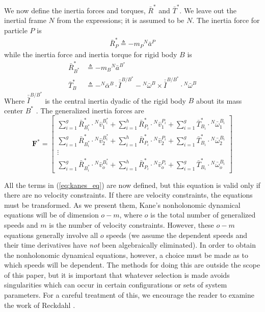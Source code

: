 \documentclass[smallcondensed,final]{svjour3}                     %
\begin{document}
We now define the inertia forces and torques, $\bar{R}^*$ and $\bar{T}^*$. We
leave out the inertial frame $N$ from the expressions; it is assumed to be $N$.
The inertia force for particle $P$ is
\begin{align}
\label{eq:particle_gen_inertia}
\bar{R}^*_P \triangleq -m_P {^N}\bar{a}^P
\end{align}
while the inertia force and inertia torque for rigid body $B$ is
\begin{align}
\label{eq:rb_translational_gen_inertia}
\bar{R}^*_{B^*} &\triangleq -m_B {^N}\bar{a}^{B^*} \\
\label{eq:rb_rotational_gen_inertia}
\bar{T}^*_B &\triangleq -{^N}\bar{\alpha}^B \cdot \bar{\bar{I}}^{B/B^*} -
{^N}\bar{\omega}^B \times \bar{\bar{I}}^{B/B^*} \cdot {^N}\bar{\omega}^B
\end{align}
Where $\bar{\bar{I}}^{B/B^*}$ is the central inertia dyadic of the rigid body
$B$ about its mass center $B^*$ \cite{Kane1985}. The generalized inertia forces
are
\begin{equation}
\label{eq:definition_Fstar}
\mathbf{F}^* =
\begin{bmatrix}
\displaystyle \sum_{i=1}^g \bar{R}^*_{B^*_i} \cdot {^N}\bar{v}^{B^*_i}_1 +
\sum_{i=1}^h \bar{R}^*_{P_i} \cdot {^N}\bar{v}^{P_i}_1 +
\sum_{i=1}^g \bar{T}^*_{B_i} \cdot {^N}\bar{\omega}^{B_i}_1 \\
\displaystyle \sum_{i=1}^g \bar{R}^*_{B^*_i} \cdot {^N}\bar{v}^{B^*_i}_2 +
\sum_{i=1}^h \bar{R}^*_{P_i} \cdot {^N}\bar{v}^{P_i}_2 +
\sum_{i=1}^g \bar{T}^*_{B_i} \cdot {^N}\bar{\omega}^{B_i}_2 \\
\displaystyle \vdots \\
\displaystyle \sum_{i=1}^g \bar{R}^*_{B^*_i} \cdot {^N}\bar{v}^{B^*_i}_o +
\sum_{i=1}^h \bar{R}^*_{P_i} \cdot {^N}\bar{v}^{P_i}_o +
\sum_{i=1}^g \bar{T}^*_{B_i} \cdot {^N}\bar{\omega}^{B_i}_o
\end{bmatrix}
\end{equation}

All the terms in (\ref{eq:kanes_eq}) are now defined, but this equation is
valid only if there are no velocity constraints. If there are velocity
constraints, the equations must be transformed. As we present them, Kane's
nonholonomic dynamical equations will be of dimension $o - m$, where $o$ is the
total number of generalized speeds and $m$ is the number of velocity
constraints. However, these $o-m$ equations generally involve all $o$ speeds
(we assume the dependent speeds and their time derivatives have \textit{not}
been algebraically eliminated). In order to obtain the nonholonomic dynamical
equations, however, a choice must be made as to which speeds will be dependent.
The methods for doing this are outside the scope of this paper, but it is
important that whatever selection is made avoids singularities which can occur
in certain configurations or sets of system parameters. For a careful treatment
of this, we encourage the reader to examine the work of Reckdahl
\cite{Reckdahl1996}.
\end{document}
